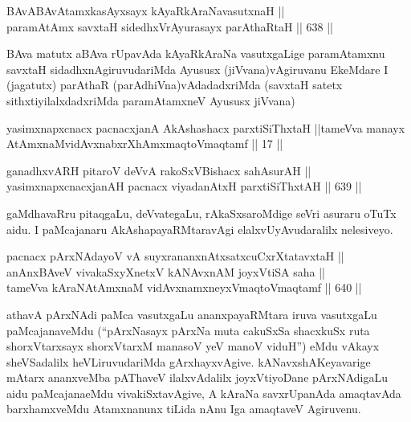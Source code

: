 
\begin{shl}
BAvABAvAtamxkasAyxsayx kAyaRkAraNavasutxnaH || \\
paramAtAmx savxtaH sidedhxVrAyurasayx parAthaRtaH \hfill || 638 ||  
\end{shl}

\begin{artha}
BAva matutx aBAva rUpavAda kAyaRkAraNa vasutxgaLige paramAtamxnu
savxtaH sidadhxnAgiruvudariMda Ayususx (jiVvana)\break vAgiruvanu EkeMdare
I (jagatutx) parAthaR (parAdhiVna)vAdadadxriMda (savxtaH satetx
sithxtiyilalxdadxriMda paramAtamxneV Ayususx jiVvana) 
\end{artha}


\begin{kandikeshl}
yasimxnapxcnacx pacnacxjanA AkAshashacx parxtiSiThxtaH ||tameVva manayx AtAmxnaM\break vidAvxnabxrXhAmxmaqtoV\s maqtamf || 17 ||
\end{kandikeshl}


\begin{shl}
ganadhxvARH pitaroV deVvA rakoSxVBishacx sahAsurAH || \\
yasimxnapxcnacxjanAH pacnacx viyadanAtxH parxtiSiThxtAH \hfill || 639 ||  
\end{shl}

\begin{artha}
gaMdhavaRru pitaqgaLu, deVvategaLu, rAkaSxsaroMdige seVri asuraru
oTuTx aidu. I paMcajanaru AkAshapayaRMtaravAgi elalxvU\break yAvudaralilx
nelesiveyo.
\end{artha}

\begin{shl}
pacnacx pArxNAdayoV vA suyxrananxnAtxsatxcuCxrXtatavxtaH || \\
anAnxBAveV vivakaSxyXnetxV kANAvxnAM joyxVtiSA saha || \\
tameVva kAraNAtAmxnaM vidAvxnamxneyxV\s maqtoV\s maqtamf \hfill || 640 ||  
\end{shl}

\begin{artha}
athavA pArxNAdi paMca vasutxgaLu ananxpayaRMtara iruva vasutxgaLu
paMcajanaveMdu (``pArxNasayx pArxNa muta cakuSxSa shacxkuSx ruta shorxVtarxsayx shorxVtarxM manasoV yeV manoV viduH'') eMdu vAkayx sheVSadalilx heVLiruvudariMda
gArxhayxvAgive. kANavxshAKeyavarige mAtarx ananxveMba pAThaveV
ilalxvAdalilx joyxVtiyoDane pArxNAdigaLu aidu paMcajanaeMdu
vivakiSxtavAgive, A kAraNa savxrUpanAda amaqtavAda barxhamxveMdu
Atamxnanunx tiLida nAnu Iga amaqtaveV Agiruvenu.
\end{artha}

